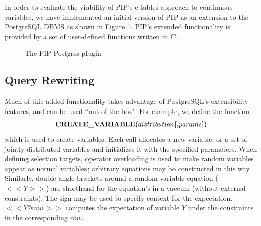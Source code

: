 In order to evaluate the viability of PIP's c-tables approach to continuous variables, we have implemented an initial version of PIP as an extension to the PostgreSQL DBMS as shown in Figure \ref{fig:blockdiag}.  PIP's extended functionality is provided by a set of user-defined functions written in C.  

\begin{figure}
\begin{center}
\caption{The PIP Postgres plugin}
\label{fig:blockdiag}
\end{center}
\end{figure}

\subsection{Query Rewriting}
Much of this added functionality takes advantage of PostgreSQL's extensibility features, and can be used ``out-of-the-box".  For example, we define the function 
\[
\mbox{\textbf{CREATE\_VARIABLE($distribution$[,$params$])}}
\]
which is used to create variables.  Each call allocates a new variable, or a set of jointly distributed variables and initializes it with the specified parameters.  When defining selection targets, operator overloading is used to make random variables appear as normal variables; arbitrary equations may be constructed in this way.  Similarly, double angle brackets around a random variable equation ($<< Y >>$) are shorthand for the equation's in a vaccum (without external constraints).  The \@ sign may be used to specify context for the expectation.  $<< Y @ row >>$ computes the expectation of variable $Y$ under the constraints in the corresponding $row$.


